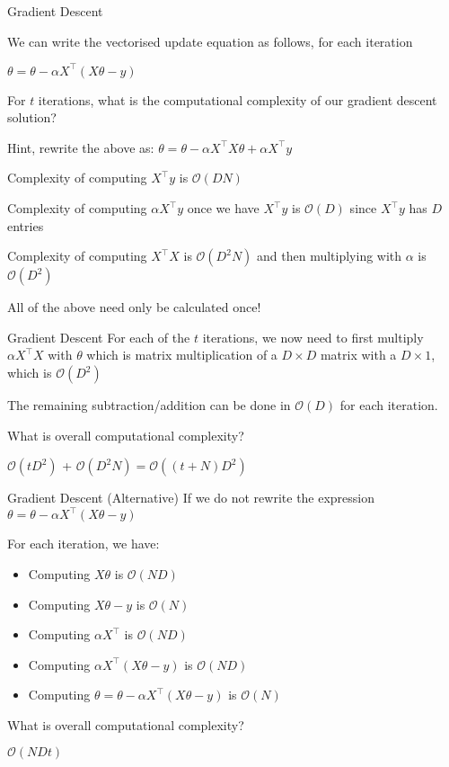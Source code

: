 \documentclass{beamer}
\begin{document}
\begin{frame}{Gradient Descent}


We can write the vectorised update equation as follows, for each iteration

\(\theta=\theta - \alpha X^{\top}(X \theta-y)\) 


\pause For $t$ iterations, what is the computational complexity of our gradient descent solution?

\pause Hint, rewrite the above as: \(\theta=\theta - \alpha X^{\top}X \theta+ \alpha X^{\top}y\) 

\pause Complexity of computing $X^{\top}y$ is $\mathcal{O}(DN)$

\pause Complexity of computing $\alpha X^{\top}y$ once we have $X^{\top}y$ is $\mathcal{O}(D)$ since  $X^{\top}y$ has $D$ entries

\pause Complexity of computing $X^{\top}X$ is $\mathcal{O}(D^2N)$ and then multiplying with $\alpha$ is  $\mathcal{O}(D^2)$

\pause All of the above need only be calculated once!



\end{frame}



\begin{frame}{Gradient Descent}
\pause For each of the $t$ iterations, we now need to first multiply  $\alpha X^{\top}X$ with $\theta$ which is matrix multiplication of a $D \times D$ matrix with a $D \times 1$, which is $\mathcal{O}(D^2)$ 

\pause The remaining subtraction/addition can be done in $\mathcal{O}(D)$ for each iteration.

\pause What is overall computational complexity?

\pause $\mathcal{O}(tD^2)$ + $\mathcal{O}(D^2N) = \mathcal{O}((t+N)D^2)$
\end{frame}

\begin{frame}{Gradient Descent (Alternative)}
\pause If we do not rewrite the expression
\(\theta=\theta - \alpha X^{\top}(X \theta-y)\) 

For each iteration, we have:
\begin{itemize}[<+->]
	\item Computing $X\theta$ is $\mathcal{O}(ND)$
	\item Computing $X\theta - y$ is $\mathcal{O}(N)$
	\item Computing $\alpha X^{\top}$ is $\mathcal{O}(ND)$
	\item Computing $\alpha X^{\top}(X\theta - y)$ is $\mathcal{O}(ND)$
	\item Computing \(\theta=\theta - \alpha X^{\top}(X \theta-y)\) is $\mathcal{O}(N)$
\end{itemize}

\pause What is overall computational complexity?

\pause $\mathcal{O}(NDt)$
\end{frame}
\end{document}
